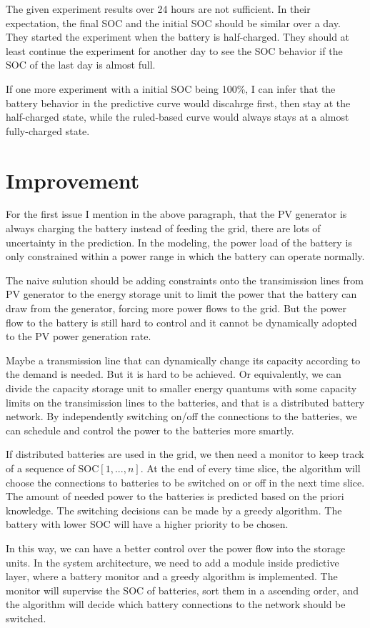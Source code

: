 \documentclass[11pt]{article}
\begin{document}
The given experiment results over 24 hours are not sufficient. In their expectation, the final SOC and the initial SOC should be similar over a day. They started the experiment when the battery is half-charged. They should at least continue the experiment for another day to see the SOC behavior if the SOC of the last day is almost full.

If one more experiment with a initial SOC being 100\%, I can infer that the battery behavior in the predictive curve would discahrge first, then stay at the half-charged state, while the ruled-based curve would always stays at a almost fully-charged state.

\section{Improvement}
For the first issue I mention in the above paragraph, that the PV generator is always charging the battery instead of feeding the grid, there are lots of uncertainty in the prediction. In the modeling, the power load of the battery is only constrained within a power range in which the battery can operate normally. 

The naive sulution should be adding constraints onto the transimission lines from PV generator to the energy storage unit to limit the power that the battery can draw from the generator, forcing more power flows to the grid. But the power flow to the battery is still hard to control and it cannot be dynamically adopted to the PV power generation rate.

Maybe a transmission line that can dynamically change its capacity according to the demand is needed. But it is hard to be achieved. Or equivalently, we can divide the capacity storage unit to smaller energy quantums with some capacity limits on the transimission lines to the batteries, and that is a distributed battery network. By independently switching on/off the connections to the batteries, we can schedule and control the power to the batteries more smartly.

If distributed batteries are used in the grid, we then need a monitor to keep track of a sequence of $\mathrm{SOC}[1,...,n]$. At the end of every time slice, the algorithm will choose the connections to batteries to be switched on or off in the next time slice. The amount of needed power to the batteries is predicted based on the priori knowledge. The switching decisions can be made by a greedy algorithm. The battery with lower SOC will have a higher priority to be chosen.

In this way, we can have a better control over the power flow into the storage units. In the system architecture, we need to add a module inside predictive layer, where a battery monitor and a greedy algorithm is implemented. The monitor will supervise the SOC of batteries, sort them in a ascending order, and the algorithm will decide which battery connections to the network should be switched.
\end{document}
